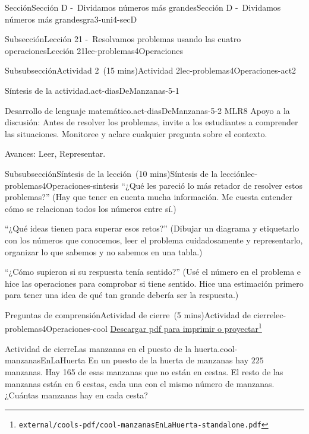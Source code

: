 \documentclass[oneside,10pt,]{article}
\begin{document}
\begin{sectionptx}{Sección}{Sección D -~Dividamos números más grandes}{}{Sección D -~Dividamos números más grandes}{}{}{gra3-uni4-secD}
\begin{subsectionptx}{Subsección}{Lección 21 -~Resolvamos problemas usando las cuatro operaciones}{}{Lección 21}{}{}{lec-problemas4Operaciones}
\begin{subsubsectionptx}{Subsubsección}{Actividad 2~(15 mins)}{}{Actividad 2}{}{}{lec-problemas4Operaciones-act2}
\begin{paragraphs}{Síntesis de la actividad.}{act-diasDeManzanas-5-1}
\end{paragraphs}%
\begin{paragraphs}{Desarrollo de lenguaje matemático.}{act-diasDeManzanas-5-2}%
MLR8 Apoyo a la discusión: Antes de resolver los problemas, invite a los estudiantes a comprender las situaciones. Monitoree y aclare cualquier pregunta sobre el contexto.%
\par
Avances: Leer, Representar.%
\end{paragraphs}%
\end{subsubsectionptx}
%
%
\typeout{************************************************}
\typeout{************************************************}
%
\begin{subsubsectionptx}{Subsubsección}{Síntesis de la lección~(10 mins)}{}{Síntesis de la lección}{}{}{lec-problemas4Operaciones-sintesis}
``¿Qué les pareció lo más retador de resolver estos problemas?'' (Hay que tener en cuenta mucha información. Me cuesta entender cómo se relacionan todos los números entre sí.)%
\par
``¿Qué ideas tienen para superar esos retos?'' (Dibujar un diagrama y etiquetarlo con los números que conocemos, leer el problema cuidadosamente y representarlo, organizar lo que sabemos y no sabemos en una tabla.)%
\par
``¿Cómo supieron si su respuesta tenía sentido?'' (Usé el número en el problema e hice las operaciones para comprobar si tiene sentido. Hice una estimación primero para tener una idea de qué tan grande debería ser la respuesta.)%
\end{subsubsectionptx}
%
%
\typeout{************************************************}
\typeout{************************************************}
%
\begin{reading-questions-subsubsection}{Preguntas de comprensión}{Actividad de cierre~(5 mins)}{}{Actividad de cierre}{}{}{lec-problemas4Operaciones-cool}
\href{external/cools-pdf/cool-manzanasEnLaHuerta-standalone.pdf}{Descargar pdf para imprimir o proyectar}\footnote{\nolinkurl{external/cools-pdf/cool-manzanasEnLaHuerta-standalone.pdf}\label{lec-problemas4Operaciones-cool-5}}\begin{project}{Actividad de cierre}{Las manzanas en el puesto de la huerta.}{cool-manzanasEnLaHuerta}%
En un puesto de la huerta de manzanas hay \(225\) manzanas. Hay 165 de esas manzanas que no están en cestas. El resto de las manzanas están en \(6\) cestas, cada una con el mismo número de manzanas. ¿Cuántas manzanas hay en cada cesta?%

\end{project}
\end{reading-questions-subsubsection}
\end{subsectionptx}
\end{sectionptx}
\end{document}

